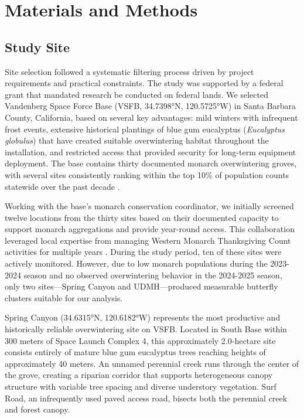 \section{Materials and Methods}

\subsection{Study Site}

Site selection followed a systematic filtering process driven by project requirements and practical constraints. The study was supported by a federal grant that mandated research be conducted on federal lands. We selected Vandenberg Space Force Base (VSFB, 34.7398°N, 120.5725°W) in Santa Barbara County, California, based on several key advantages: mild winters with infrequent frost events, extensive historical plantings of blue gum eucalyptus (\textit{Eucalyptus globulus}) that have created suitable overwintering habitat throughout the installation, and restricted access that provided security for long-term equipment deployment. The base contains thirty documented monarch overwintering groves, with several sites consistently ranking within the top 10\% of population counts statewide over the past decade \autocite{xercesGuideWesternMonarch2025}. 

Working with the base's monarch conservation coordinator, we initially screened twelve locations from the thirty sites based on their documented capacity to support monarch aggregations and provide year-round access. This collaboration leveraged local expertise from managing Western Monarch Thanksgiving Count activities for multiple years \autocite{xercesGuideWesternMonarch2025}. During the study period, ten of these sites were actively monitored. However, due to low monarch populations during the 2023-2024 season and no observed overwintering behavior in the 2024-2025 season, only two sites—Spring Canyon and UDMH—produced measurable butterfly clusters suitable for our analysis.

Spring Canyon (34.6315°N, 120.6182°W) represents the most productive and historically reliable overwintering site on VSFB. Located in South Base within 300 meters of Space Launch Complex 4, this approximately 2.0-hectare site consists entirely of mature blue gum eucalyptus trees reaching heights of approximately 40 meters. An unnamed perennial creek runs through the center of the grove, creating a riparian corridor that supports heterogeneous canopy structure with variable tree spacing and diverse understory vegetation. Surf Road, an infrequently used paved access road, bisects both the perennial creek and forest canopy. 

